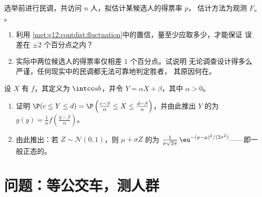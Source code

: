 \begin{exercise}[$\star\star\star$]\label{exo:g12:contdist:8}
选举前进行民调，共访问 $n$ 人，拟估计某候选人的得票率 $p$，
估计方法为观测 $F_n$。
\begin{enumerate}
  \item 利用
        \cref{met:g12:contdist:fluctuation}中的置信，量至少应取多少，才能保证
        误差在 $\pm 2$ 个百分点之内？
  \item 实际中两位候选人的得票率仅相差 $1$ 个百分点。试说明
        无论调查设计得多么严谨，任何现实中的民调都无法可靠地判定胜者，
        其原因何在。
\end{enumerate}
\end{exercise}

\begin{exercise}[$\star\star\star$]\label{exo:g12:contdist:9}
设 $X$ 有 $f$，其定义为 $\intcc ab$，并令
$Y = \alpha X + \beta$，其中 $\alpha > 0$。
\begin{enumerate}
  \item 证明 $\P(c \leq Y \leq d)
        = \P\left(\frac{c - \beta}{\alpha} \leq X \leq
        \frac{d-\beta}{\alpha}\right)$，并由此推出 $Y$ 的为
        $g(y) = \frac{1}{\alpha} f\left(\frac{y - \beta}{\alpha}\right)$。
  \item 由此推出：若 $Z \sim \mathcal N(0,1)$，则
        $\mu + \sigma Z$ 的为
        $\frac{1}{\sigma\sqrt{2\pi}}\,
        \eu^{-(y - \mu)^2/(2\sigma^2)}$——即一般正态的。
\end{enumerate}
\end{exercise}

\section{问题：等公交车，测人群}

